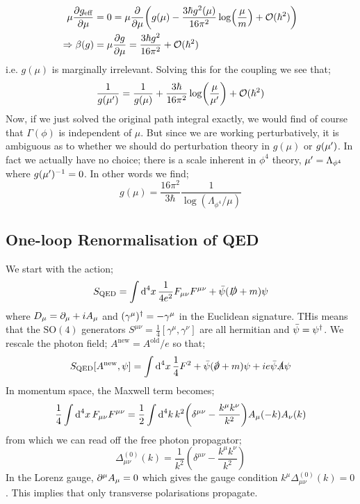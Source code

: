 \begin{align*}
\mu\frac{\del g_{\text{eff}}}{\del \mu} &= 0 = \mu\frac{\del}{\del \mu}\left(g(\mu) - \frac{3\hbar g^2(\mu)}{16\pi^2}\log\left(\frac{\mu}{m}\right) + \mO(\hbar^2)\right) \\
\Rightarrow \beta(g) &= \mu \frac{\del g}{\del \mu} = \frac{3\hbar g^2}{16\pi^2} + \mO(\hbar^2)
\end{align*}
i.e. $g(\mu)$ is marginally irrelevant. Solving this for the coupling we see that;
\begin{equation}
\frac{1}{g(\mu\pr)} = \frac{1}{g(\mu)} + \frac{3\hbar}{16\pi^2}\log\left(\frac{\mu}{\mu\pr}\right) + \mO(\hbar^2)
\end{equation}
Now, if we just solved the original path integral exactly, we would find of course that $\Gamma(\phi)$ is independent of $\mu$. But since we are working perturbatively, it is ambiguous as to whether we should do perturbation theory in $g(\mu)$ or $g(\mu^{\prime})$. In fact we actually have no choice; there is a scale inherent in $\phi^4$ theory, $\mu^{\prime} = \Lambda_{\phi^4}$ where $g(\mu^{\prime})^{-1} = 0$. In other words we find;
\begin{equation*}
g(\mu) = \frac{16\pi^2}{3\hbar}\frac{1}{\log(\Lambda_{\phi^4}/\mu)}
\end{equation*}
\subsection{One-loop Renormalisation of QED}
We start with the action;
\begin{equation}
S_{\text{QED}} = \int{\text{d}^4 x \,\frac{1}{4e^2}F_{\mu\nu}F^{\mu\nu} + \bar{\psi}(\slashed{D} + m)\psi}
\end{equation}
where $D_\mu = \partial_\mu + i A_\mu$ and $(\gamma^{\mu})^{\dagger} = - \gamma^{\mu}$ in the Euclidean signature. THis means that the $\text{SO}(4)$ generators $S^{\mu\nu} = \tfrac{1}{4}[\gamma^{\mu}, \gamma^{\nu}]$ are all hermitian and $\bar{\psi} = \psi^{\dagger}$. We rescale the photon field; $A^{\text{new}} = A^{\text{old}}/e$ so that;
\begin{equation*}
S_{\text{QED}}[A^{\text{new}}, \psi] = \int{\upd{^4 x}\frac{1}{4}F^2 + \bar{\psi}(\slashed{\del} + m)\psi + ie\bar{\psi}\slashed{A}\psi}
\end{equation*}
In momentum space, the Maxwell term becomes;
\begin{equation*}
\frac{1}{4}\int{\upd{^4 x}F_{\mu\nu}F^{\mu\nu}} = \frac{1}{2}\int{\upd{^4 k}k^2 \left(\delta^{\mu\nu} - \frac{k^{\mu}k^{\nu}}{k^2}\right)A_{\mu}(-k)A_{\nu}(k)}
\end{equation*}
from which we can read off the free photon propagator;
\begin{equation*}
\Delta^{(0)}_{\mu\nu}(k) = \frac{1}{k^2}\left(\delta^{\mu\nu} - \frac{k^{\mu}k^{\nu}}{k^2}\right)
\end{equation*}
In the Lorenz gauge, $\partial^{\mu}A_\mu = 0$ which gives the gauge condition $k^{\mu}\Delta^{(0)}_{\mu\nu}(k) = 0$. This implies that only transverse polarisations propagate.
